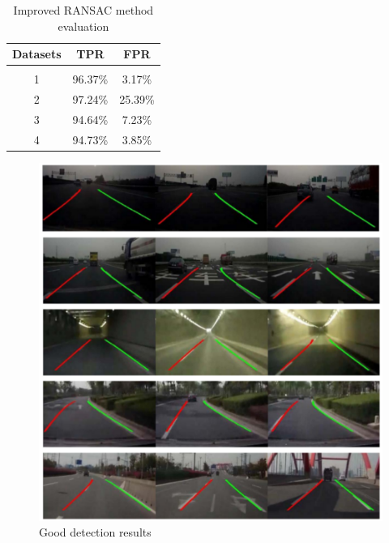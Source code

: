 \documentclass[conference]{IEEEtran}
\begin{document}
\begin{table}[]
\centering
\caption{Improved RANSAC method evaluation}
\label{eval1}
\begin{tabular}{c c c}
\hline
Datasets & TPR & FPR \\
\hline 
\\
1 & 96.37\% & 3.17\% \\
2 & 97.24\% & 25.39\% \\
3 & 94.64\% & 7.23\% \\
4 & 94.73\% & 3.85\% \\
\end{tabular}
\end{table}


\begin{figure}[ht]
	\centering
   \includegraphics[scale = 0.5]{pictures/good_detections.pdf}
	\caption{Good detection results \cite{ransac}}
	\label{fig5}
\end{figure}
\end{document}
